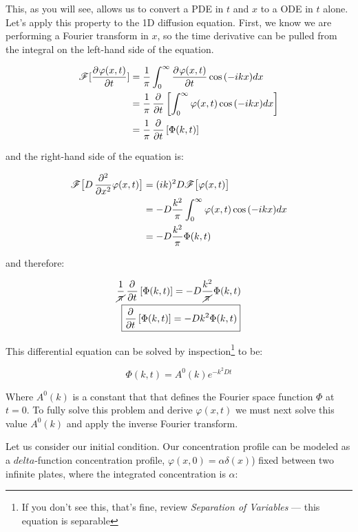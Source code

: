 \begin{displayquote}
This, as you will see, allows us to convert a PDE in $t$ and $x$ to a ODE in $t$ alone. Let's apply this property to the 1D diffusion equation. First, we know we are performing a Fourier transform in $x$, so the time derivative can be pulled from the integral on the left-hand side of the equation.

\begin{align}
	\mathscr{F}[\mathop{}\!\frac{\partial^{}{\varphi(x,t)}}{\partial{t}^{}}] &= \frac{1}{\pi}\int_{0}^{\infty} \mathop{}\!\frac{\partial^{}{\varphi(x,t)}}{\partial{t}^{}} \cos{(-ikx)} dx\\
	&= \frac{1}{\pi}\mathop{}\!\frac{\partial^{}{}}{\partial{t}^{}}\left[\int_{0}^{\infty}\varphi(x,t)\cos{(-ikx)} dx\right]\\
	&= \frac{1}{\pi}\mathop{}\!\frac{\partial^{}{}}{\partial{t}^{}}\left[\Phi(k,t)\right]
\end{align}

and the right-hand side of the equation is:

\begin{align}
		\mathscr{F}\big[D\mathop{}\!\frac{\partial^{2}{}}{\partial{x}^{2}}\varphi(x,t)\big] &= (ik)^2D\mathscr{F}\big[\varphi(x,t)\big]\\
	&= -D\frac{k^2}{\pi}\int_0^{\infty}\varphi(x,t)\cos{(-ikx)} dx\\ 
	&= -D\frac{k^2}{\pi} \Phi(k,t)
\end{align}

and therefore:

\begin{align}
	\frac{1}{\cancel{\pi}}\Partial{}{}{t}\left[\Phi(k,t)\right] &= -D\frac{k^2}{\cancel{\pi}} \Phi(k,t)\\
	\Aboxed{\Partial{}{}{t}\left[\Phi(k,t)\right] &= -Dk^2 \Phi(k,t)}
\end{align}

This differential equation can be solved by inspection\footnote{If you don't see this, that's fine, review \textit{Separation of Variables} --- this equation is separable} to be:

\begin{equation}
	\Phi(k,t) = A^{0}(k) e^{-k^2Dt}
	\label{eq:Sol1}
\end{equation}

Where $A^0(k)$ is a constant that that defines the Fourier space function $\Phi$ at $t=0$. To fully solve this problem and derive $\varphi(x,t)$ we must next solve this value $A^0(k)$ and apply the inverse Fourier transform.

Let us consider our initial condition. Our concentration profile can be modeled as a $delta$-function concentration profile, $\varphi(x,0) = \alpha \delta(x)$) fixed between two infinite plates, where the integrated concentration is $\alpha$:


\end{displayquote}
